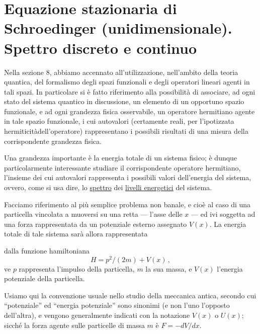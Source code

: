 \documentclass[11pt, a4paper]{book}
\numberwithin{equation}{section}
\begin{document}
\section{Equazione stazionaria di Schroedinger (unidimensionale). Spettro
discreto e continuo}

Nella sezione 8, abbiamo accennato all'utilizzazione, nell'ambito
della teoria quantica, del formalismo degli spazi funzionali e degli operatori lineari agenti in tali spazi. In particolare si è fatto riferimento
alla possibilità di associare, ad ogni stato del sistema quantico in discussione, un elemento di un opportuno spazio funzionale, e ad ogni
grandezza fisica osservabile, un operatore hermitiano agente in tale
spazio funzionale, i cui autovalori (certamente reali, per l'ipotizzata
hermiticitàdell'operatore) rappresentano i possibili risultati di una misura della corrispondente grandezza fisica.

Una grandezza importante è la energia totale di un sistema fisico;
è dunque particolarmente interessante studiare il corrispondente operatore
hermitiano, l'insieme dei cui autovalori rappresenta i possibili valori
dell'energia del sistema, ovvero, come si usa dire, lo \uline{spettro} dei \uline{livelli
energetici} del sistema.

Facciamo riferimento al più semplice problema non banale, e cioè
al caso di una particella vincolata a muoversi su una retta --- l'asse delle $x$ --- ed ivi soggetta ad una forza rappresentata da un potenziale esterno
assegnato $V(x)$. La energia totale di tale sistema sarà allora rappresentata


dalla funzione hamiltoniana
\begin{equation}
H = p^2/(2m) + V(x) \,, \tag{1}
\end{equation}
ve $p$ rappresenta l'impulso della particella, $m$ la sua massa, e $V(x)$
l'energia potenziale della particella.

Usiamo qui la convenzione usuale nello studio della meccanica
antica, secondo cui ``potenziale'' ed ``energia potenziale'' sono sinonimi
(e non l'uno l'opposto dell'altra), e vengono generalmente indicati
con la notazione $V(x)$ o $U(x)$; sicché la forza agente sulle particelle di
massa $m$ è $F = -dV/dx$.
\end{document}
